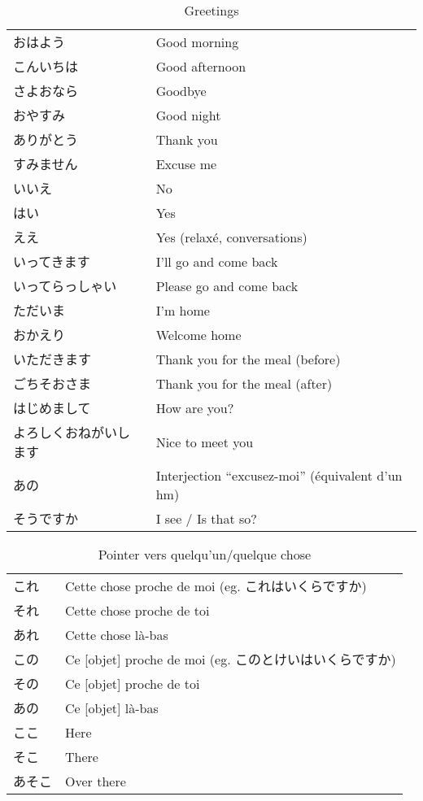 \documentclass[a4paper,10pt,french,openany]{memoir}
\begin{document}
\begin{table}[h]
 \centering
 \begin{tabular}{ll}
  おはよう & Good morning \\
  こんいちは & Good afternoon \\
  さよおなら & Goodbye \\
  おやすみ & Good night \\
  ありがとう & Thank you \\
  すみません & Excuse me \\
  いいえ & No \\
  はい & Yes \\
  ええ & Yes (relaxé, conversations) \\
  いってきます & I'll go and come back \\
  いってらっしゃい & Please go and come back \\
  ただいま & I'm home \\
  おかえり & Welcome home \\
  いただきます & Thank you for the meal (before) \\
  ごちそおさま & Thank you for the meal (after) \\
  はじめまして & How are you? \\
  よろしくおねがいします & Nice to meet you \\
  あの & Interjection ``excusez-moi'' (équivalent d'un hm) \\
  そうですか & I see / Is that so? \\
 \end{tabular}
 \caption{Greetings}
 \label{tab:greetings}
\end{table}

\begin{table}[h]
 \centering
 \begin{tabular}{ll}
  これ & Cette chose proche de moi (eg. これはいくらですか) \\
  それ & Cette chose proche de toi \\
  あれ & Cette chose là-bas \\
  この & Ce [objet] proche de moi (eg. このとけいはいくらですか) \\
  その & Ce [objet] proche de toi \\
  あの & Ce [objet] là-bas \\
  ここ & Here \\
  そこ & There \\
  あそこ & Over there \\
 \end{tabular}
 \caption{Pointer vers quelqu'un/quelque chose}
 \label{tab:pointeurs}
\end{table}
\end{document}

